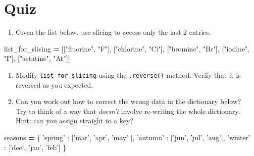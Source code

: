 \documentclass[]{book}
\newenvironment{Shaded}{\begin{snugshade}}{\end{snugshade}}
\newcommand{\NormalTok}[1]{#1}
\newcommand{\OperatorTok}[1]{\textcolor[rgb]{0.81,0.36,0.00}{\textbf{#1}}}
\newcommand{\StringTok}[1]{\textcolor[rgb]{0.31,0.60,0.02}{#1}}
\providecommand{\tightlist}{%
  \setlength{\itemsep}{0pt}\setlength{\parskip}{0pt}}
\theoremstyle{definition}
\theoremstyle{definition}
\theoremstyle{definition}
\theoremstyle{remark}
\begin{document}
\hypertarget{quiz-1}{%
\section{Quiz}\label{quiz-1}}

\begin{enumerate}
\def\labelenumi{\arabic{enumi}.}
\tightlist
\item
  Given the list below, use slicing to access only the last 2 entries.
\end{enumerate}

\begin{Shaded}
\begin{Highlighting}[]
\NormalTok{list_for_slicing }\OperatorTok{=}\NormalTok{ [[}\StringTok{"fluorine"}\NormalTok{, }\StringTok{"F"}\NormalTok{], }
\NormalTok{                    [}\StringTok{"chlorine"}\NormalTok{, }\StringTok{"Cl"}\NormalTok{], }
\NormalTok{                    [}\StringTok{"bromine"}\NormalTok{, }\StringTok{"Br"}\NormalTok{], }
\NormalTok{                    [}\StringTok{"iodine"}\NormalTok{, }\StringTok{"I"}\NormalTok{], }
\NormalTok{                    [}\StringTok{"astatine"}\NormalTok{, }\StringTok{"At"}\NormalTok{]]}
\end{Highlighting}
\end{Shaded}

\begin{enumerate}
\def\labelenumi{\arabic{enumi}.}
\setcounter{enumi}{1}
\item
  Modify \texttt{list\_for\_slicing} using the \texttt{.reverse()}
  method. Verify that it is reversed as you expected.
\item
  Can you work out how to correct the wrong data in the dictionary
  below? Try to think of a way that \emph{doesn't} involve re-writing
  the whole dictionary. Hint: can you assign straight to a key?
\end{enumerate}

\begin{Shaded}
\begin{Highlighting}[]
\NormalTok{seasons }\OperatorTok{=}\NormalTok{ \{}
  \StringTok{'spring'}\NormalTok{ : [}\StringTok{'mar'}\NormalTok{, }\StringTok{'apr'}\NormalTok{, }\StringTok{'may'}\NormalTok{ ],}
  \StringTok{'autumn'}\NormalTok{ : [}\StringTok{'jun'}\NormalTok{, }\StringTok{'jul'}\NormalTok{, }\StringTok{'aug'}\NormalTok{],}
  \StringTok{'winter'}\NormalTok{ : [}\StringTok{'dec'}\NormalTok{, }\StringTok{'jan'}\NormalTok{, }\StringTok{'feb'}\NormalTok{]}
\NormalTok{\}}
\end{Highlighting}
\end{Shaded}
\end{document}
